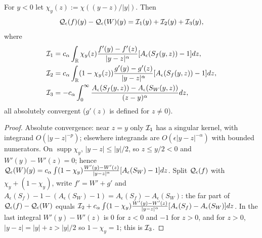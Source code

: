 \begin{lemma}
  \label{lem:c07_negative_Q_split}
  For $y<0$ let $\chi_y(z):=\chi((y-z)/|y|)$. Then
  \begin{equation}\label{eqn:approx_negative_Q_split}
    \mathcal{Q}_\epsilon(f)(y)-\mathcal{Q}_\epsilon(W)(y)=\mathcal{I}_1(y)+\mathcal{I}_2(y)+\mathcal{I}_3(y),
  \end{equation}
  where
  \begin{align*}
    \mathcal{I}_1&=c_\alpha\int_{\mathbb{R}}\chi_y(z)\frac{f'(y)-f'(z)}{|y-z|^\alpha}[A_\epsilon(S_f(y,z))-1]dz,\\
    \mathcal{I}_2&=c_\alpha\int_{\mathbb{R}}(1-\chi_y(z))\frac{g'(y)-g'(z)}{|y-z|^\alpha}[A_\epsilon(S_f(y,z))-1]dz,\\
    \mathcal{I}_3&=-c_\alpha\int_0^\infty\frac{A_\epsilon(S_f(y,z))-A_\epsilon(S_W(y,z))}{(z-y)^\alpha}dz,
  \end{align*}
  all absolutely convergent ($g'(z)$ is defined for $z\neq0$).
\end{lemma}
\begin{proof}
  Absolute convergence: near $z=y$ only $\mathcal{I}_1$ has a singular kernel, with integrand
  $O(|y-z|^{-p})$; elsewhere integrands are $O(\epsilon|y-z|^{-\alpha})$ with bounded numerators.
  On $\operatorname{supp}\chi_y$, $|y-z|\le|y|/2$, so $z\le y/2<0$ and $W'(y)-W'(z)=0$; hence
  $\mathcal{Q}_\epsilon(W)(y)=c_\alpha\int(1-\chi_y)\frac{W'(y)-W'(z)}{|y-z|^\alpha}[A_\epsilon(S_W)-1]dz$. Split
  $\mathcal{Q}_\epsilon(f)$ with $\chi_y+(1-\chi_y)$, write $f'=W'+g'$ and $A_\epsilon(S_f)-1-(A_\epsilon(S_W)-1)=A_\epsilon(S_f)-A_\epsilon(S_W)$:
  the far part of $\mathcal{Q}_\epsilon(f)-\mathcal{Q}_\epsilon(W)$ equals $\mathcal{I}_2+c_\alpha\int(1-\chi_y)\frac{W'(y)-W'(z)}{|y-z|^\alpha}[A_\epsilon(S_f)-A_\epsilon(S_W)]dz$.
  In the last integral $W'(y)-W'(z)$ is $0$ for $z<0$ and $-1$ for $z>0$, and for $z>0$,
  $|y-z|=|y|+z>|y|/2$ so $1-\chi_y=1$; this is $\mathcal{I}_3$.
\end{proof}

